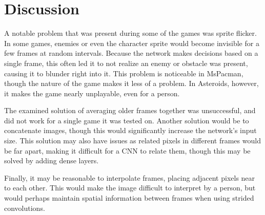 \documentclass{article}
\begin{document}
\section{Discussion}

A notable problem that was present during some of the games was sprite flicker. In some games, enemies or even the character sprite would become invisible for a few frames at random intervals. Because the network makes decisions based on a single frame, this often led it to not realize an enemy or obstacle was present, causing it to blunder right into it. This problem is noticeable in MsPacman, though the nature of the game makes it less of a problem. In Asteroids, however, it makes the game nearly unplayable, even for a person.

The examined solution of averaging older frames together was unsuccessful, and did not work for a single game it was tested on. Another solution would be to concatenate images, though this would significantly increase the network's input size. This solution may also have issues as related pixels in different frames would be far apart, making it difficult for a CNN to relate them, though this may be solved by adding dense layers.

Finally, it may be reasonable to interpolate frames, placing adjacent pixels near to each other. This would make the image difficult to interpret by a person, but would perhaps maintain spatial information between frames when using strided convolutions.

%


\label{sec:References}




\end{document}
